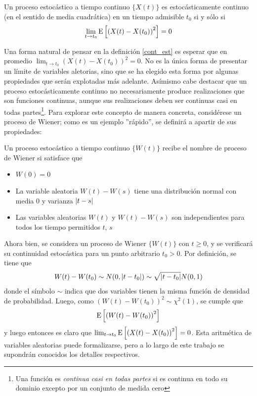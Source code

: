 \begin{defn}
Un proceso estoc\'astico a tiempo continuo $\{ X(t) \}$ es estoc\'asticamente continuo
(en el sentido de media cuadr\'atica)
en un tiempo admisible $t_0$ si y s\'olo si
\begin{equation*}
\lim_{t \rightarrow t_0} \mathrm{E}\left[ \left( X(t) - X(t_0) \right)^{2} \right] = 0
\end{equation*}
\label{cont_est}
\end{defn}

Una forma natural de pensar en la definici\'on \ref{cont_est} es esperar que en promedio
$\lim_{t \rightarrow t_0} \left( X(t) - X(t_0) \right)^{2} = 0$. 
No es la \'unica forma de presentar un l\'imite de variables aletorias, sino que se ha elegido
esta forma por algunas propiedades que ser\'an explotadas m\'as adelante. 
As\'imismo cabe destacar que un proceso estoc\'asticamente continuo no necesariamente produce 
realizaciones que son funciones continuas, aunque sus realizaciones deben ser continuas 
casi en todas partes\footnote{Una funci\'on es \textit{continua casi en todas partes} si
es continua en todo su dominio excepto por un conjunto de medida cero}.
Para explorar este concepto de manera concreta, consid\'erese un proceso de Wiener; como es 
un ejemplo ''r\'apido'', se definir\'a a apartir de sus propiedades:

\begin{defn}
Un proceso estoc\'astico a tiempo continuo $\{ W(t) \}$ recibe el nombre de proceso
de Wiener si satisface que
\begin{itemize}
\item $W(0) = 0$
\item La variable aleatoria $W(t) - W(s)$ tiene una distribuci\'on normal con media 0 y 
varianza $\lvert t-s \rvert$
\item Las variables aleatorias ${W(t)}$ y ${W(t) - W(s)}$ son independientes para
todos los tiempo permitidos $t$, $s$
\end{itemize} 
\end{defn}

Ahora bien, se considera un proceso de Wiener $\{W(t)\}$ con $t\geq 0$, y se verificar\'a su 
continuidad estoc\'astica para un punto arbitrario $t_0 > 0$. Por definici\'on, se tiene
que 
$$W(t) - W(t_0) \sim N(0,\lvert t-t_0 \rvert) \sim \sqrt{\lvert t-t_0 \rvert} N(0,1)$$
donde el s\'imbolo $\sim$ indica que dos variables tienen la misma funci\'on de densidad de 
probabilidad. Luego, como $ \left( W(t) - W(t_0) \right)^{2} \sim \chi^{2}(1) $, se cumple que
$$
\mathrm{E}\left[ \left( W(t) - W(t_0) \right)^{2} \right]
$$
y luego entonces es claro que $\lim_{t \rightarrow t_0} \mathrm{E}\left[ \left( X(t) - X(t_0) \right)^{2} \right] = 0$.
Esta aritm\'etica de variables aleatorias puede formalizarse, pero a lo largo de
este trabajo se supondr\'an conocidos los detalles respectivos.

